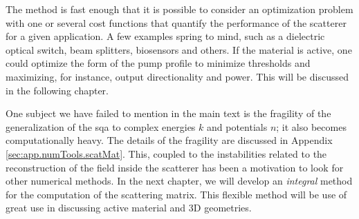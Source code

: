 The method is fast enough that it is possible to consider
an optimization problem with one or several cost functions
that quantify the performance of the scatterer for a
given application. A few examples spring to mind, such as
a dielectric optical switch, beam splitters, biosensors and others. 
If the material is active, one could optimize the form of the pump 
profile to minimize thresholds and maximizing, for instance, output
directionality and power. This will be discussed in the following chapter.

One subject we have failed to mention in the main text is the 
fragility of the generalization of the \gls{sqa} to complex
energies $k$ and potentials $n$; it also becomes computationally
heavy. The details of the fragility are discussed in Appendix
\ref{sec:app.numTools.scatMat}. This, coupled to the instabilities
related to the reconstruction of the field inside the scatterer
has been a motivation to look for other numerical methods. In 
the next chapter, we will develop an \textit{integral} method
for the computation of the scattering matrix. This flexible
method will be use of great use in discussing active material 
and 3D geometries. 

% 
%   
